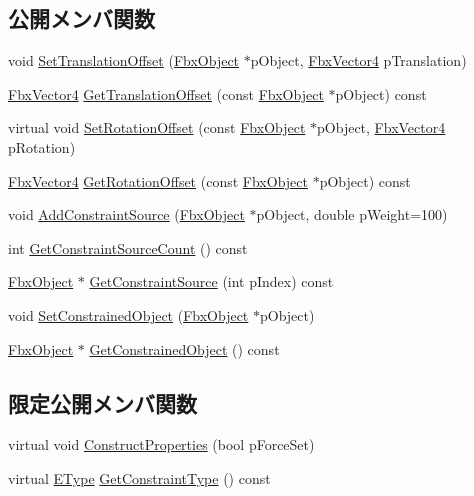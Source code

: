 \subsection*{公開メンバ関数}
\begin{DoxyCompactItemize}
\item 
void \hyperlink{class_fbx_constraint_parent_ae821dbbc810b2ee3f27c46d0a66ec55f}{Set\+Translation\+Offset} (\hyperlink{class_fbx_object}{Fbx\+Object} $\ast$p\+Object, \hyperlink{class_fbx_vector4}{Fbx\+Vector4} p\+Translation)
\item 
\hyperlink{class_fbx_vector4}{Fbx\+Vector4} \hyperlink{class_fbx_constraint_parent_a8ba24a43fc99dbef7819ccb921b1ba19}{Get\+Translation\+Offset} (const \hyperlink{class_fbx_object}{Fbx\+Object} $\ast$p\+Object) const
\item 
virtual void \hyperlink{class_fbx_constraint_parent_a22d24573f7d06251dcf94bb488a32386}{Set\+Rotation\+Offset} (const \hyperlink{class_fbx_object}{Fbx\+Object} $\ast$p\+Object, \hyperlink{class_fbx_vector4}{Fbx\+Vector4} p\+Rotation)
\item 
\hyperlink{class_fbx_vector4}{Fbx\+Vector4} \hyperlink{class_fbx_constraint_parent_a35f64fd4fccedbd4070d5e2bdb9ce06b}{Get\+Rotation\+Offset} (const \hyperlink{class_fbx_object}{Fbx\+Object} $\ast$p\+Object) const
\item 
void \hyperlink{class_fbx_constraint_parent_af1cb13c89d62f1de2478a5a102fd5788}{Add\+Constraint\+Source} (\hyperlink{class_fbx_object}{Fbx\+Object} $\ast$p\+Object, double p\+Weight=100)
\item 
int \hyperlink{class_fbx_constraint_parent_aa7747054ebeee0f94ce907451f648497}{Get\+Constraint\+Source\+Count} () const
\item 
\hyperlink{class_fbx_object}{Fbx\+Object} $\ast$ \hyperlink{class_fbx_constraint_parent_a687e5a56dfd3882d4ff0c3454a976051}{Get\+Constraint\+Source} (int p\+Index) const
\item 
void \hyperlink{class_fbx_constraint_parent_a49473a23e0aae69dd06ee4bd19b6fee3}{Set\+Constrained\+Object} (\hyperlink{class_fbx_object}{Fbx\+Object} $\ast$p\+Object)
\item 
\hyperlink{class_fbx_object}{Fbx\+Object} $\ast$ \hyperlink{class_fbx_constraint_parent_a8c878a029a5628f328244f824d3f8847}{Get\+Constrained\+Object} () const
\end{DoxyCompactItemize}
\subsection*{限定公開メンバ関数}
\begin{DoxyCompactItemize}
\item 
virtual void \hyperlink{class_fbx_constraint_parent_af968ae8a08629c4c259ec70ce2697c0e}{Construct\+Properties} (bool p\+Force\+Set)
\item 
virtual \hyperlink{class_fbx_constraint_a49c1634663395eab7c28856df233ec66}{E\+Type} \hyperlink{class_fbx_constraint_parent_a02f6bd2dda6447a23d81d82ce06b73f0}{Get\+Constraint\+Type} () const
\end{DoxyCompactItemize}
